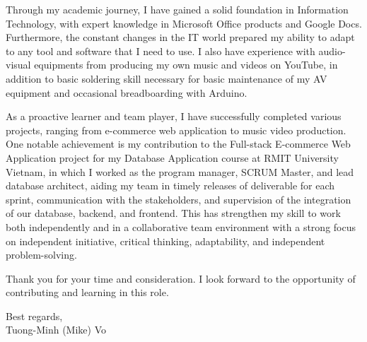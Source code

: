 \documentclass[a4paper,11pt]{article}
\newcommand{\p}[1]{#1\\\vspace{6pt}}
\begin{document}
\p{Through my academic journey, I have gained a solid foundation in Information Technology, with expert knowledge in Microsoft Office products and Google Docs. Furthermore, the constant changes in the IT world prepared my ability to adapt to any tool and software that I need to use. I also have experience with audio-visual equipments from producing my own music and videos on YouTube, in addition to basic soldering skill necessary for basic maintenance of my AV equipment and occasional breadboarding with Arduino.}

\p{As a proactive learner and team player, I have successfully completed various projects, ranging from e-commerce web application to music video production. One notable achievement is my contribution to the Full-stack E-commerce Web Application project for my Database Application course at RMIT University Vietnam, in which I worked as the program manager, SCRUM Master, and lead database architect, aiding my team in timely releases of deliverable for each sprint, communication with the stakeholders, and supervision of the integration of our database, backend, and frontend. This has strengthen my skill to work both independently and in a collaborative team environment with a strong focus on independent initiative, critical thinking, adaptability, and independent problem-solving.}

\p{Thank you for your time and consideration. I look forward to the opportunity of contributing and learning in this role.}

\p{Best regards,\\
Tuong-Minh (Mike) Vo}
%
\end{document}
